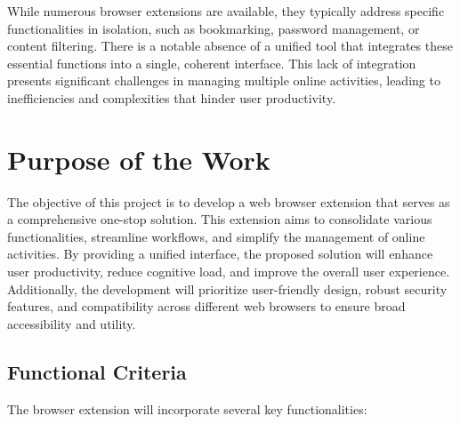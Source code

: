 While numerous browser extensions are available, they typically address specific functionalities in isolation, such as bookmarking, password management, or content filtering. There is a notable absence of a unified tool that integrates these essential functions into a single, coherent interface. This lack of integration presents significant challenges in managing multiple online activities, leading to inefficiencies and complexities that hinder user productivity.

%
%
\section{Purpose of the Work}
\label{sec:intro:goal}

The objective of this project is to develop a web browser extension that serves as a comprehensive one-stop solution. This extension aims to consolidate various functionalities, streamline workflows, and simplify the management of online activities. By providing a unified interface, the proposed solution will enhance user productivity, reduce cognitive load, and improve the overall user experience. Additionally, the development will prioritize user-friendly design, robust security features, and compatibility across different web browsers to ensure broad accessibility and utility.

\subsection{Functional Criteria}
The browser extension will incorporate several key functionalities:

